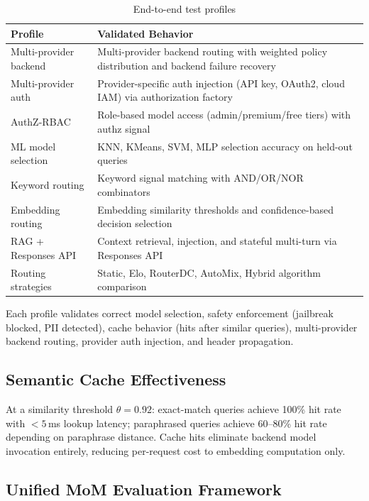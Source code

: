 \begin{table}[htbp]
\centering
\caption{End-to-end test profiles}
\label{tab:e2e_profiles}
\begin{tabularx}{\linewidth}{
  >{\raggedright\arraybackslash}p{2.4cm}
  >{\raggedright\arraybackslash}X
}
\toprule
\textbf{Profile} & \textbf{Validated Behavior} \\
\midrule
Multi-provider backend & Multi-provider backend routing with weighted policy distribution and backend failure recovery \\
Multi-provider auth & Provider-specific auth injection (API key, OAuth2, cloud IAM) via authorization factory \\
AuthZ-RBAC          & Role-based model access (admin/premium/free tiers) with authz signal \\
ML model selection  & KNN, KMeans, SVM, MLP selection accuracy on held-out queries \\
Keyword routing     & Keyword signal matching with AND/OR/NOR combinators \\
Embedding routing   & Embedding similarity thresholds and confidence-based decision selection \\
RAG + Responses API & Context retrieval, injection, and stateful multi-turn via Responses API \\
Routing strategies  & Static, Elo, RouterDC, AutoMix, Hybrid algorithm comparison \\
\bottomrule
\end{tabularx}
\end{table}

Each profile validates correct model selection, safety enforcement (jailbreak blocked, PII detected), cache behavior (hits after similar queries), multi-provider backend routing, provider auth injection, and header propagation.

\subsection{Semantic Cache Effectiveness}

At a similarity threshold $\theta = 0.92$:
exact-match queries achieve 100\% hit rate with $< 5$\,ms lookup latency;
paraphrased queries achieve 60--80\% hit rate depending on paraphrase distance.
Cache hits eliminate backend model invocation entirely, reducing per-request cost to embedding computation only.

\subsection{Unified MoM Evaluation Framework}

